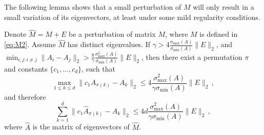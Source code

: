 The following lemma shows that a small perturbation of $M$ will only result in a small variation of its eigenvectors, at least under some mild regularity conditions.
\begin{lemma}
\label{lem:eigenvectorvariation}
Denote $\widehat{M} = M+E$ be a perturbation of matrix $M$, where $M$ is defined in  \eqref{eq:M2}. 
Assume $\widehat{M}$ has distinct eigenvalues. 
If $\gamma > 4 \frac{\sigma_{\max}(A)}{\sigma_{\min}(A)}\|E\|_2$, and $\min_{i,j:i\neq j} \|A_i - A_j\|_2 > \frac{8}{\gamma}\frac{\sigma_{\max}^2(A)}{\sigma_{\min}(A) } \|E\|_2$, then there exist a permutation $\pi$ and constants $\{c_1,\ldots,c_d\}$, such that 
\[
\max_{1\le k\le d} \| c_1\widehat{A}_{\pi(k)} - A_k\|_2 \le 4  \frac{\sigma_{\max}^2(A)}{\gamma \sigma_{\min}(A) } \|E\|_2\,,
\]
and therefore
\[
\sum_{k=1}^{d}\| c_1\widehat{A}_{\pi(k)} - A_k\|_2 \le 4d  \frac{\sigma_{\max}^2(A)}{\gamma \sigma_{\min}(A)} \|E\|_2\,,
\]
where $\widehat{A}$ is the matrix of eigenvectors of $\widehat{M}$. 
\end{lemma}
